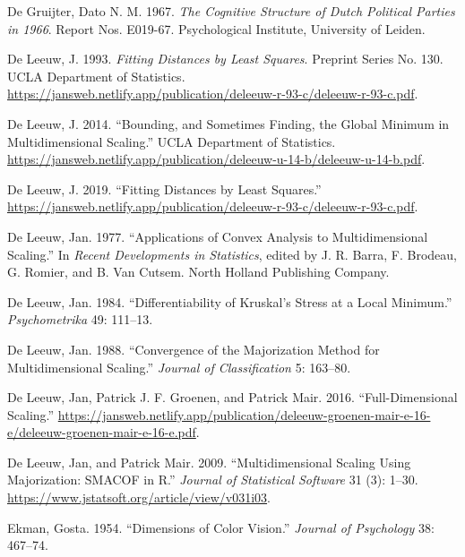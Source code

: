 \documentclass[
  12pt,
]{article}
\newlength{\cslhangindent}
\newenvironment{CSLReferences}[2] %
 {\begin{list}{}{%
  \setlength{\itemindent}{0pt}
  \setlength{\leftmargin}{0pt}
  \setlength{\parsep}{0pt}
  \ifodd #1
   \setlength{\leftmargin}{\cslhangindent}
   \setlength{\itemindent}{-1\cslhangindent}
  \fi
  \setlength{\itemsep}{#2\baselineskip}}}
 {\end{list}}
\begin{document}
\protect{}\label{refs}
\begin{CSLReferences}{1}{1}
De Gruijter, Dato N. M. 1967. \emph{{The Cognitive Structure of Dutch Political Parties in 1966}}. Report Nos. E019-67. Psychological Institute, University of Leiden.

De Leeuw, J. 1993. \emph{Fitting Distances by Least Squares}. Preprint Series No. 130. UCLA Department of Statistics. \url{https://jansweb.netlify.app/publication/deleeuw-r-93-c/deleeuw-r-93-c.pdf}.

De Leeuw, J. 2014. {``{Bounding, and Sometimes Finding, the Global Minimum in Multidimensional Scaling}.''} UCLA Department of Statistics. \url{https://jansweb.netlify.app/publication/deleeuw-u-14-b/deleeuw-u-14-b.pdf}.

De Leeuw, J. 2019. {``{Fitting Distances by Least Squares}.''} \url{https://jansweb.netlify.app/publication/deleeuw-r-93-c/deleeuw-r-93-c.pdf}.

De Leeuw, Jan. 1977. {``Applications of Convex Analysis to Multidimensional Scaling.''} In \emph{Recent Developments in Statistics}, edited by J. R. Barra, F. Brodeau, G. Romier, and B. Van Cutsem. North Holland Publishing Company.

De Leeuw, Jan. 1984. {``{Differentiability of Kruskal's Stress at a Local Minimum}.''} \emph{Psychometrika} 49: 111--13.

De Leeuw, Jan. 1988. {``Convergence of the Majorization Method for Multidimensional Scaling.''} \emph{Journal of Classification} 5: 163--80.

De Leeuw, Jan, Patrick J. F. Groenen, and Patrick Mair. 2016. {``Full-Dimensional Scaling.''} \url{https://jansweb.netlify.app/publication/deleeuw-groenen-mair-e-16-e/deleeuw-groenen-mair-e-16-e.pdf}.

De Leeuw, Jan, and Patrick Mair. 2009. {``{Multidimensional Scaling Using Majorization: SMACOF in R}.''} \emph{Journal of Statistical Software} 31 (3): 1--30. \url{https://www.jstatsoft.org/article/view/v031i03}.

Ekman, Gosta. 1954. {``{Dimensions of Color Vision}.''} \emph{Journal of Psychology} 38: 467--74.


\end{CSLReferences}
\end{document}
